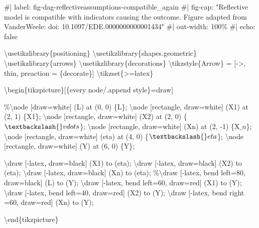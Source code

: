 \documentclass[
  letterpaper,
  DIV=11,
  numbers=noendperiod]{scrartcl}
\newenvironment{Shaded}{\begin{snugshade}}{\end{snugshade}}
\newcommand{\NormalTok}[1]{\textcolor[rgb]{0.00,0.23,0.31}{#1}}
\begin{document}
\begin{Shaded}
\begin{Highlighting}[]
\NormalTok{\#| label: fig{-}dag{-}reflectiveassumptions{-}compatible\_again}
\NormalTok{\#| fig{-}cap: "Reflective model is compatible with indicators causing the outcome. Figure adapted from VanderWeele: doi: 10.1097/EDE.0000000000001434"}
\NormalTok{\#| out{-}width: 100\%}
\NormalTok{\#| echo: false}

\NormalTok{\textbackslash{}usetikzlibrary\{positioning\}}
\NormalTok{\textbackslash{}usetikzlibrary\{shapes.geometric\}}
\NormalTok{\textbackslash{}usetikzlibrary\{arrows\}}
\NormalTok{\textbackslash{}usetikzlibrary\{decorations\}}
\NormalTok{\textbackslash{}tikzstyle\{Arrow\} = [{-}\textgreater{}, thin, preaction = \{decorate\}]}
\NormalTok{\textbackslash{}tikzset\{\textgreater{}=latex\}}

\NormalTok{\textbackslash{}begin\{tikzpicture\}[\{every node/.append style\}=draw]}


\NormalTok{\%\textbackslash{}node [draw=white] (L) at (0, 0) \{L\};}
\NormalTok{\textbackslash{}node [rectangle, draw=white] (X1) at (2, 1) \{X1\};}
\NormalTok{\textbackslash{}node [rectangle, draw=white] (X2) at (2, 0) \{$\textbackslash{}vdots$\};}
\NormalTok{\textbackslash{}node [rectangle, draw=white] (Xn) at (2, {-}1) \{X$\_n$\};}
\NormalTok{\textbackslash{}node [rectangle, draw=white] (eta) at (4, 0) \{$\textbackslash{}eta$\};}
\NormalTok{\textbackslash{}node [rectangle, draw=white] (Y) at (6, 0) \{Y\};}



\NormalTok{\textbackslash{}draw [{-}latex, draw=black] (X1) to (eta);}
\NormalTok{\textbackslash{}draw [{-}latex, draw=black] (X2) to (eta);}
\NormalTok{\textbackslash{}draw [{-}latex, draw=black] (Xn) to (eta);}
\NormalTok{\%\textbackslash{}draw [{-}latex, bend left=80, draw=black] (L) to (Y);}
\NormalTok{\textbackslash{}draw [{-}latex, bend left=60, draw=red] (X1) to (Y);}
\NormalTok{\textbackslash{}draw [{-}latex, bend left=40, draw=red] (X2) to (Y);}
\NormalTok{\textbackslash{}draw [{-}latex, bend right =60,  draw=red] (Xn) to (Y);}



\NormalTok{\textbackslash{}end\{tikzpicture\}}
\end{Highlighting}
\end{Shaded}
\end{document}
